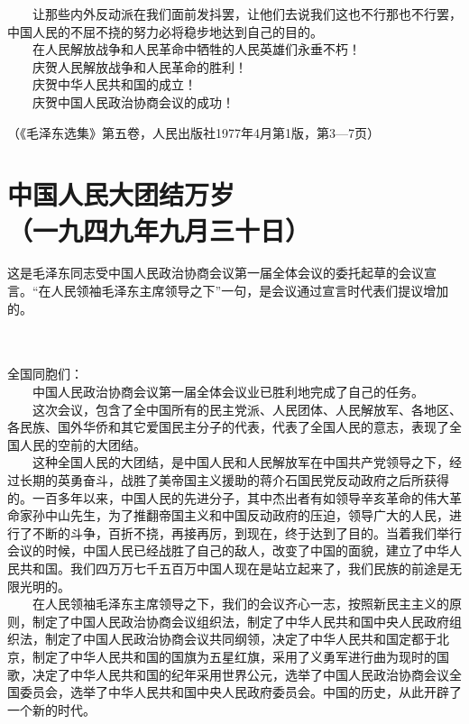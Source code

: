 \documentclass[cn,11pt,chinese]{elegantbook}
\def\myformat#1{\hfil\hfil #1}
\begin{document}
　　让那些内外反动派在我们面前发抖罢，让他们去说我们这也不行那也不行罢，中国人民的不屈不挠的努力必将稳步地达到自己的目的。\\
　　在人民解放战争和人民革命中牺牲的人民英雄们永垂不朽！\\
　　庆贺人民解放战争和人民革命的胜利！\\
　　庆贺中华人民共和国的成立！\\
　　庆贺中国人民政治协商会议的成功！\\
\begin{flushright}（《毛泽东选集》第五卷，人民出版社1977年4月第1版，第3—7页）\end{flushright}
\newpage\section*{\myformat{中国人民大团结万岁}\\\myformat{（一九四九年九月三十日）}}
\begin{introduction}\item  这是毛泽东同志受中国人民政治协商会议第一届全体会议的委托起草的会议宣言。“在人民领袖毛泽东主席领导之下”一句，是会议通过宣言时代表们提议增加的。\end{introduction}\\~\\
全国同胞们：\\
　　中国人民政治协商会议第一届全体会议业已胜利地完成了自己的任务。\\
　　这次会议，包含了全中国所有的民主党派、人民团体、人民解放军、各地区、各民族、国外华侨和其它爱国民主分子的代表，代表了全国人民的意志，表现了全国人民的空前的大团结。\\
　　这种全国人民的大团结，是中国人民和人民解放军在中国共产党领导之下，经过长期的英勇奋斗，战胜了美帝国主义援助的蒋介石国民党反动政府之后所获得的。一百多年以来，中国人民的先进分子，其中杰出者有如领导辛亥革命的伟大革命家孙中山先生，为了推翻帝国主义和中国反动政府的压迫，领导广大的人民，进行了不断的斗争，百折不挠，再接再厉，到现在，终于达到了目的。当着我们举行会议的时候，中国人民已经战胜了自己的敌人，改变了中国的面貌，建立了中华人民共和国。我们四万万七千五百万中国人现在是站立起来了，我们民族的前途是无限光明的。\\
　　在人民领袖毛泽东主席领导之下，我们的会议齐心一志，按照新民主主义的原则，制定了中国人民政治协商会议组织法，制定了中华人民共和国中央人民政府组织法，制定了中国人民政治协商会议共同纲领，决定了中华人民共和国定都于北京，制定了中华人民共和国的国旗为五星红旗，采用了义勇军进行曲为现时的国歌，决定了中华人民共和国的纪年采用世界公元，选举了中国人民政治协商会议全国委员会，选举了中华人民共和国中央人民政府委员会。中国的历史，从此开辟了一个新的时代。\\
\end{document}
